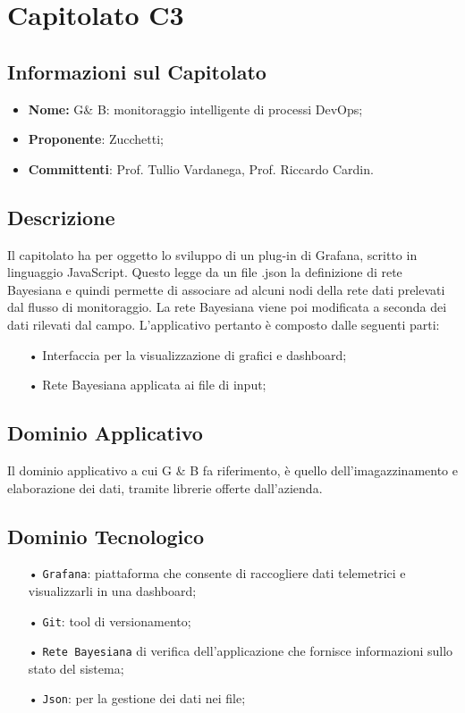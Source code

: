 \section{Capitolato C3}
\subsection{Informazioni sul Capitolato}
\begin{itemize}
	\item \textbf{Nome:} G\&{} B: monitoraggio intelligente di processi DevOps;
	\item \textbf{Proponente}: Zucchetti;
	\item \textbf{Committenti}: Prof. Tullio Vardanega, Prof. Riccardo Cardin.
\end{itemize}

\subsection{Descrizione}
Il capitolato ha per oggetto lo sviluppo di un plug-in di Grafana, scritto in linguaggio JavaScript. Questo legge da un file .json la definizione di rete Bayesiana e quindi permette di associare ad alcuni nodi della rete dati prelevati dal flusso di monitoraggio.
La rete Bayesiana viene poi modificata a seconda dei dati rilevati dal campo. 
L'applicativo pertanto è composto dalle seguenti parti: 

\begin{itemize}

\item[•] Interfaccia per la visualizzazione di grafici e dashboard;
\item[•] Rete Bayesiana applicata ai file di input;

\end{itemize}

\subsection{Dominio Applicativo}
Il dominio applicativo a cui G \& B fa riferimento, è quello dell'imagazzinamento e elaborazione dei dati, tramite librerie offerte dall'azienda. 

\subsection{Dominio Tecnologico}
\begin{itemize}

\item[•] \texttt{Grafana}: piattaforma che consente di raccogliere dati telemetrici e visualizzarli in una dashboard;
\item[•] \texttt{Git}: tool di versionamento;
\item[•] \texttt{Rete Bayesiana} di verifica dell'applicazione che fornisce informazioni sullo stato del sistema;
\item[•] \texttt{Json}: per la gestione dei dati nei file;

\end{itemize}

